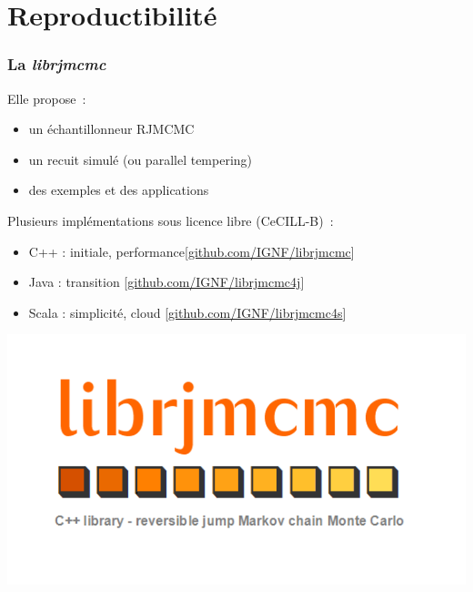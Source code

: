 \documentclass{beamer}
\begin{document}
\section{Reproductibilité}
\begin{frame}
\frametitle{La \emph{librjmcmc}}

Elle propose~:
\begin{itemize}
\item un \'echantillonneur RJMCMC
\item un recuit simul\'e (ou parallel tempering)
\item des exemples et des applications
\end{itemize}

Plusieurs impl\'ementations sous licence libre (CeCILL-B)~:
\begin{itemize}
\item  C++ : initiale, performance\hfill \small[\url{github.com/IGNF/librjmcmc}]
\item  Java  : transition \hfill \small[\url{github.com/IGNF/librjmcmc4j}]
\item  Scala : simplicité, cloud \hfill \small[\url{github.com/IGNF/librjmcmc4s}]
\end{itemize}

\hfill\includegraphics[width = 0.5\linewidth]{librjmcmc}
\end{frame}
\end{document}
